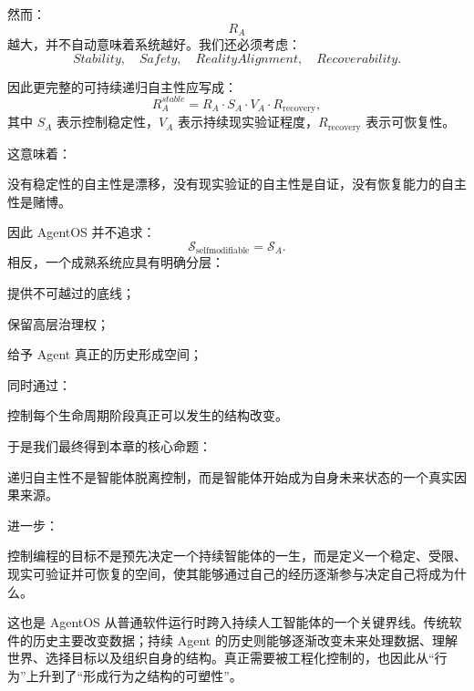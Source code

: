 然而：
\[
R_A
\]
越大，并不自动意味着系统越好。我们还必须考虑：
\[
Stability,
\quad
Safety,
\quad
RealityAlignment,
\quad
Recoverability.
\]

因此更完整的可持续递归自主性应写成：
\[
\boxed{
R_A^{stable}
=
R_A
\cdot
S_A
\cdot
V_A
\cdot
R_{\mathrm{recovery}},
}
\]
其中 $S_A$ 表示控制稳定性，$V_A$ 表示持续现实验证程度，$R_{\mathrm{recovery}}$ 表示可恢复性。

这意味着：

\begin{statementbox}
没有稳定性的自主性是漂移，没有现实验证的自主性是自证，没有恢复能力的自主性是赌博。
\end{statementbox}

因此 AgentOS 并不追求：
\[
\mathcal S_{\mathrm{selfmodifiable}}
=
\mathcal S_A.
\]
相反，一个成熟系统应具有明确分层：

\begin{statementbox}
\centering
{}
\end{statementbox}
提供不可越过的底线；

\begin{statementbox}
\centering
{}
\end{statementbox}
保留高层治理权；

\begin{statementbox}
\centering
{}
\end{statementbox}
给予 Agent 真正的历史形成空间；

同时通过：
\begin{statementbox}
\centering
{}
\end{statementbox}
控制每个生命周期阶段真正可以发生的结构改变。

于是我们最终得到本章的核心命题：

\begin{proposition*}
递归自主性不是智能体脱离控制，而是智能体开始成为自身未来状态的一个真实因果来源。
\end{proposition*}

进一步：

\begin{statementbox}
控制编程的目标不是预先决定一个持续智能体的一生，而是定义一个稳定、受限、现实可验证并可恢复的空间，使其能够通过自己的经历逐渐参与决定自己将成为什么。
\end{statementbox}

这也是 AgentOS 从普通软件运行时跨入持续人工智能体的一个关键界线。传统软件的历史主要改变数据；持续 Agent 的历史则能够逐渐改变未来处理数据、理解世界、选择目标以及组织自身的结构。真正需要被工程化控制的，也因此从“行为”上升到了“形成行为之结构的可塑性”。
